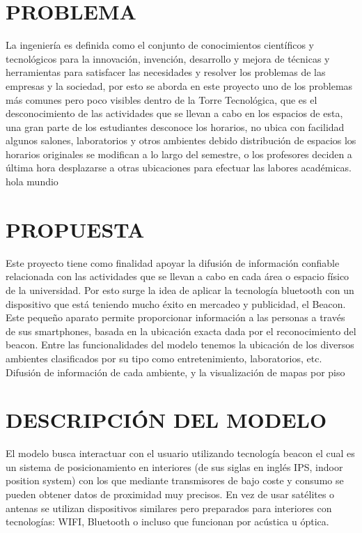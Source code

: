 \documentclass[12pt]{article}
\begin{document}
\setlength{\parindent}{0cm} %
\section{PROBLEMA}

\noindent La ingeniería es definida como el conjunto de conocimientos científicos y tecnológicos para la innovación, invención, desarrollo y mejora de técnicas y herramientas para satisfacer las necesidades y resolver los problemas de las empresas y la sociedad, por esto se aborda en este proyecto uno de los problemas más comunes pero poco visibles dentro de la Torre Tecnológica, que es el desconocimiento de las actividades que se llevan a cabo en los espacios de esta, una gran parte de los estudiantes desconoce los horarios, no ubica con facilidad algunos salones, laboratorios y otros ambientes debido distribución de espacios los horarios originales se modifican a lo largo del semestre, o los profesores deciden a última hora desplazarse a otras ubicaciones para efectuar las labores académicas. 
hola mundio

\section{PROPUESTA}
\noindent Este proyecto tiene como finalidad apoyar la difusión de información confiable relacionada con las actividades que se llevan a cabo en cada área o espacio físico de la universidad. Por esto surge la idea de aplicar la tecnología bluetooth con un dispositivo que está teniendo mucho éxito en mercadeo y publicidad, el Beacon. Este pequeño aparato permite proporcionar información a las personas a través de sus smartphones, basada en la ubicación exacta dada por el reconocimiento del beacon. Entre las funcionalidades del modelo tenemos la ubicación de los diversos ambientes clasificados por su tipo como entretenimiento, laboratorios, etc. Difusión de información de cada ambiente, y la visualización de mapas por piso

\newpage

\section{DESCRIPCIÓN DEL MODELO}

\noindent El modelo busca interactuar con el usuario utilizando tecnología beacon el cual es un sistema de posicionamiento en interiores (de sus siglas en inglés IPS, indoor position system) con los que mediante transmisores de bajo coste y consumo se pueden obtener datos de proximidad muy precisos. En vez de usar satélites o antenas se utilizan dispositivos similares pero preparados para interiores con tecnologías: WIFI, Bluetooth o incluso que funcionan por acústica u óptica.
\end{document}
